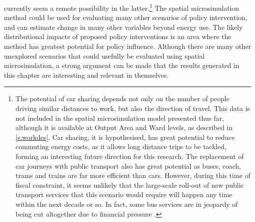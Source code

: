 currently seem a remote possibility in the 
latter.\footnote{The
potential of car sharing depends
not only on the number of people driving similar distances to work, but also the
direction of travel. This data is not included in the spatial microsimulation model
presented thus far, although it is available at Output Area and Ward levels,
as described in \cref{s:workdes}. Car sharing, it is hypothesised, has great
potential to reduce commuting energy costs, as it allows long distance trips
to be tackled, forming an interesting future direction for this research.
The replacement of car journeys with public transport also has great potential
as buses, coach, trams and trains are far more efficient than cars. However,
during this time of fiscal constraint, it seems unlikely that the large-scale
roll-out of new public transport services that this scenario would require
will happen any time within the next decade or so. In fact, some bus services
are in jeopardy of being cut altogether due to financial pressure \citep{Owen2012}.
}
The spatial microsimulation method could be used for evaluating many other
scenarios of policy intervention, and can estimate change in many other variables
beyond energy use. The likely distributional impacts of proposed policy interventions
is an area where the method has greatest potential for policy influence.
Although there are many other unexplored scenarios that could usefully be
evaluated using spatial microsimulation, a strong argument can be made that
the results generated in this chapter are interesting and relevant in themselves.

